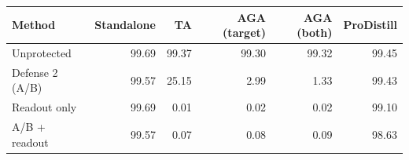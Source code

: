 \begin{tabular}{lrrrrr}
\toprule
Method & Standalone & TA & AGA (target) & AGA (both) & ProDistill \\
\midrule
Unprotected & 99.69 & 99.37 & 99.30 & 99.32 & 99.45 \\
Defense 2 (A/B) & 99.57 & 25.15 & 2.99 & 1.33 & 99.43 \\
Readout only & 99.69 & 0.01 & 0.02 & 0.02 & 99.10 \\
A/B + readout & 99.57 & 0.07 & 0.08 & 0.09 & 98.63 \\
\bottomrule
\end{tabular}
